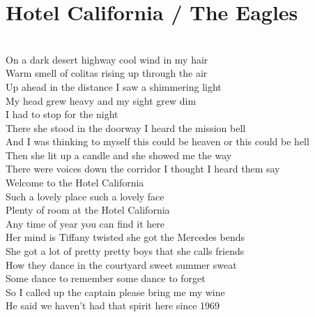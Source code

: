 \section{Hotel California / The Eagles}\label{sec:hotelcalifornia}

\Aminor
\Cmajor
\DmajorEasy
\Dminor
\Eseven
\Fmajor
\Gmajor

              \\
 On a dark desert highway  cool wind in my hair\\
 Warm smell of colitas  rising up through the air\\
 Up ahead in the distance  I saw a shimmering light\\
 My head grew heavy and my sight grew dim\\
 I had to stop for the night\\
 There she stood in the doorway  I heard the mission bell\\
 And I was thinking to myself this could be  heaven or this could be hell\\
 Then she lit up a candle  and she showed me the way\\
 There were voices down the corridor  I thought I heard them say\\
 Welcome to the Hotel California\\
Such a  lovely place such a  lovely face\\
 Plenty of room at the Hotel California\\
Any  time of year you can  find it here\\
 Her mind is Tiffany twisted  she got the Mercedes bends\\
 She got a lot of pretty pretty boys  that she calls friends\\
 How they dance in the courtyard  sweet summer sweat\\
 Some dance to remember  some dance to forget\\
 So I called up the captain  please bring me my wine\\
He said  we haven't had that spirit here since  1969\\
